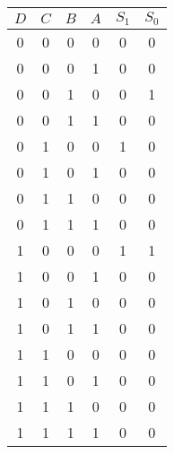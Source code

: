 




\begin{table}[H]
	\begin{center}
		\begin{tabular}{c c c c||c c}

			$D$ &	$C$ &	$B$ &	$A$ & $S_1$ & $S_0$ \\
			\hline
            0 & 0 & 0 & 0 & 0 & 0   \\

            0 & 0 & 0 & 1 & 0 & 0   \\
  
            0 & 0 & 1 & 0 & 0 & 1   \\
          
            0 & 0 & 1 & 1 & 0 & 0   \\
         
            0 & 1 & 0 & 0 & 1 & 0   \\
           
            0 & 1 & 0 & 1 & 0 & 0   \\
         
            0 & 1 & 1 & 0 & 0 & 0   \\
        
            0 & 1 & 1 & 1 & 0 & 0   \\
         
            1 & 0 & 0 & 0 & 1 & 1   \\
        
            1 & 0 & 0 & 1 & 0 & 0   \\
         
            1 & 0 & 1 & 0 & 0 & 0   \\
       
            1 & 0 & 1 & 1 & 0 & 0  \\
          
            1 & 1 & 0 & 0 & 0 & 0   \\
      
            1 & 1 & 0 & 1 & 0 & 0   \\
        
            1 & 1 & 1 & 0 & 0 & 0   \\
          
            1 & 1 & 1 & 1 & 0 & 0  \\
		
		\end{tabular}
	\end{center}
\end{table}